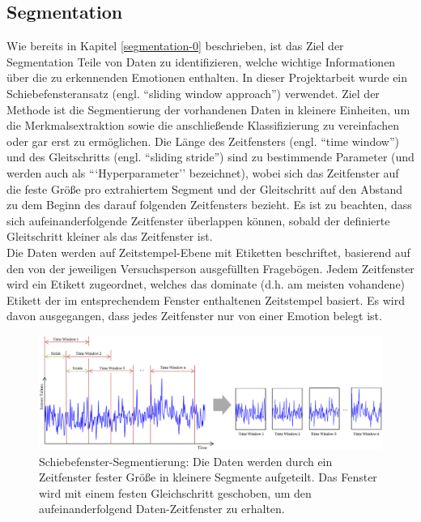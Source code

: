 \subsection{Segmentation} \label{segmenation-1}

Wie bereits in Kapitel \ref{segmentation-0} beschrieben, ist das Ziel der Segmentation Teile von Daten zu identifizieren, welche wichtige Informationen {\"u}ber die zu erkennenden Emotionen enthalten.
In dieser Projektarbeit wurde ein Schiebefensteransatz (engl. ``sliding window approach'') verwendet. 
Ziel der Methode ist die Segmentierung der vorhandenen Daten in kleinere Einheiten, um die Merkmalsextraktion sowie die anschlie{\ss}ende Klassifizierung zu vereinfachen oder gar erst zu erm{\"o}glichen.
Die L{\"a}nge des Zeitfensters (engl. ``time window'') und des Gleitschritts (engl. ``sliding stride'') sind zu bestimmende Parameter (und werden auch als ```Hyperparameter'' bezeichnet), wobei sich das Zeitfenster auf die feste Gr{\"o}{\ss}e pro extrahiertem Segment und der Gleitschritt auf den Abstand zu dem Beginn des darauf folgenden Zeitfensters bezieht.
Es ist zu beachten, dass sich aufeinanderfolgende Zeitfenster {\"u}berlappen k{\"o}nnen, sobald der definierte Gleitschritt kleiner als das Zeitfenster ist. \\


Die Daten werden auf Zeitstempel-Ebene mit Etiketten beschriftet, basierend auf den von der jeweiligen Versuchsperson ausgef{\"u}llten Frageb{\"o}gen. 
Jedem Zeitfenster wird ein Etikett zugeordnet, welches das dominate (d.h. am meisten vohandene) Etikett der im entsprechendem Fenster enthaltenen Zeitstempel basiert. Es wird davon ausgegangen, dass jedes Zeitfenster nur von einer Emotion belegt ist. \\


\begin{figure}[h]
\includegraphics[width=\textwidth]{Images/segmentation.png} 
\caption[Schiebefenster-Segmentierung]{Schiebefenster-Segmentierung: Die Daten werden durch ein Zeitfenster fester Gr{\"o}{\ss}e in kleinere Segmente aufgeteilt. Das Fenster wird mit einem festen Gleichschritt geschoben, um den aufeinanderfolgend Daten-Zeitfenster zu erhalten. }
\end{figure} 